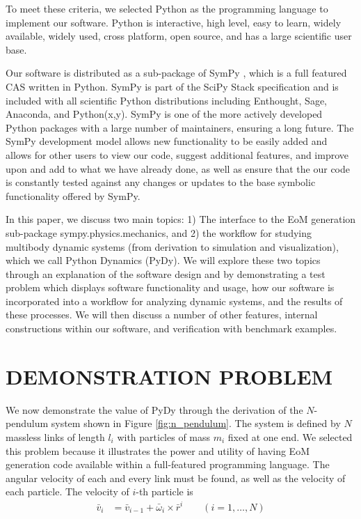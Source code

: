 \documentclass[twocolumn,10pt, final]{asme2e}
\begin{document}
To meet these criteria, we selected Python as the programming language to
implement our software. Python is interactive, high level, easy to learn,
widely available, widely used, cross platform, open source, and has a large
scientific user base.

Our software is distributed as a sub-package of SymPy \cite{sympy2012}, which
is a full featured CAS written in Python. SymPy is part of the SciPy Stack
\cite{SciPyStackGithub} specification and is included with all scientific
Python distributions including Enthought, Sage, Anaconda, and Python(x,y).
SymPy is one of the more actively developed Python packages with a large number
of maintainers, ensuring a long future. The SymPy development model allows new
functionality to be easily added and allows for other users to view our code,
suggest additional features, and improve upon and add to what we have already
done, as well as ensure that the our code is constantly tested against any
changes or updates to the base symbolic functionality offered by SymPy.

In this paper, we discuss two main topics: 1) The interface to the EoM
generation sub-package sympy.physics.mechanics, and 2) the workflow for
studying multibody dynamic systems (from derivation to simulation and
visualization), which we call Python Dynamics (PyDy). We will explore these two
topics through an explanation of the software design and by demonstrating a
test problem which displays software functionality and usage, how our software
is incorporated into a workflow for analyzing dynamic systems, and the results
of these processes. We will then discuss a number of other features, internal
constructions within our software, and verification with benchmark examples.

\section*{DEMONSTRATION PROBLEM}
We now demonstrate the value of PyDy through the derivation of the $N$-pendulum
system shown in Figure \ref{fig:n_pendulum}.  The system is defined by $N$
massless links of length $l_i$ with particles of mass $m_i$ fixed at one end.
We selected this problem because it illustrates the power and utility of having
EoM generation code available within a full-featured programming language. The
angular velocity of each and every link must be found, as well as the velocity
of each particle. The velocity of $i$-th particle is
\begin{align*}
  \bar{v}_i &= \bar{v}_{i-1} + \bar{\omega}_i \times
  \bar{r}^i \qquad (i = 1,\dots,N)
\end{align*}
\end{document}
